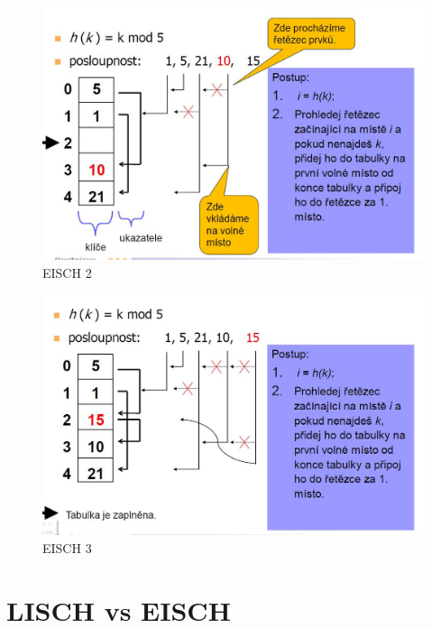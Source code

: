 \documentclass{book}
\begin{document}
\begin{figure}[h]
\begin{center}
\includegraphics[width=12cm]{EISCH2.jpg}
\caption{EISCH 2}
\label{fig:eisch2}
\end{center}
\end{figure}

\begin{figure}[h]
\begin{center}
\includegraphics[width=12cm]{EISCH3.jpg}
\caption{EISCH 3}
\label{fig:eisch3}
\end{center}
\end{figure}

\section{LISCH vs EISCH}
\end{document}
